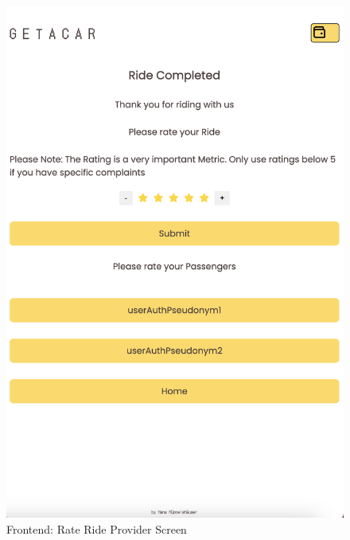 \begin{figure}[h]
    \centering
    
    \begin{minipage}{0.45\linewidth}
        \centering
        \includegraphics[width=\linewidth]{data/ffss/11.png}
        \caption{Frontend: Rate Ride Provider Screen}
        \label{fig:RateRideProviderScreen}
    \end{minipage}
    \hfill
    \begin{minipage}{0.45\linewidth}
        \centering

\end{minipage}
\end{figure}
